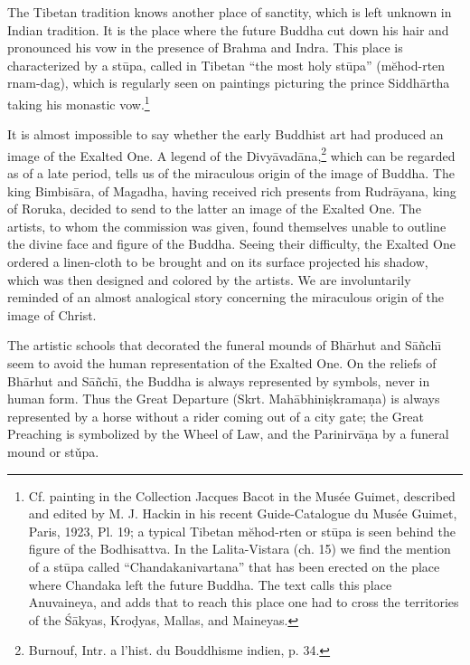 \documentclass[a4paper, 12pt, oneside]{article}
\begin{document}
The Tibetan tradition knows another place of sanctity, which is left unknown in Indian tradition. It is the place where the future Buddha cut down his hair and pronounced his vow in the presence of Brahma and Indra. This place is characterized by a st\={u}pa, called in Tibetan ``the most holy st\={u}pa'' (mĕhod-rten rnam-dag), which is regularly seen on paintings picturing the prince Siddh\={a}rtha taking his monastic vow.\footnote{Cf. painting in the Collection Jacques Bacot in the Musée Guimet, described and edited by M. J. Hackin in his recent Guide-Catalogue du Musée Guimet, Paris, 1923, Pl. 19; a typical Tibetan mĕhod-rten or st\={u}pa is seen behind the figure of the Bodhisattva. In the Lalita-Vistara (ch. 15) we find the mention of a st\={u}pa called ``Chandakanivartana'' that has been erected on the place where Chandaka left the future Buddha. The text calls this place Anuvaineya, and adds that to reach this place one had to cross the territories of the \'{S}\={a}kyas, Kro\d{d}yas, Mallas, and Maineyas.}

It is almost impossible to say whether the early Buddhist art had produced an image of the Exalted One. A legend of the Divy\={a}vad\={a}na,\footnote{Burnouf, Intr. a l'hist. du Bouddhisme indien, p. 34.} which can be regarded as of a late period, tells us of the miraculous origin of the image of Buddha. The king Bimbis\={a}ra, of Magadha, having received rich presents from Rudr\={a}yana, king of Roruka, decided to send to the latter an image of the Exalted One. The artists, to whom the commission was given, found themselves unable to outline the divine face and figure of the Buddha. Seeing their difficulty, the Exalted One ordered a linen-cloth to be brought and on its surface projected his shadow, which was then designed and colored by the artists. We are involuntarily reminded of an almost analogical story concerning the miraculous origin of the image of Christ.

The artistic schools that decorated the funeral mounds of Bh\={a}rhut and S\={a}\~{n}ch\={\i} seem to avoid the human representation of the Exalted One. On the reliefs of Bh\={a}rhut and S\={a}\~{n}ch\={\i}, the Buddha is always represented by symbols, never in human form. Thus the Great Departure (Skrt. Mah\={a}bhini\d{s}krama\d{n}a) is always represented by a horse without a rider coming out of a city gate; the Great Preaching is symbolized by the Wheel of Law, and the Parinirv\={a}\d{n}a by a funeral mound or stǔpa.
\end{document}
